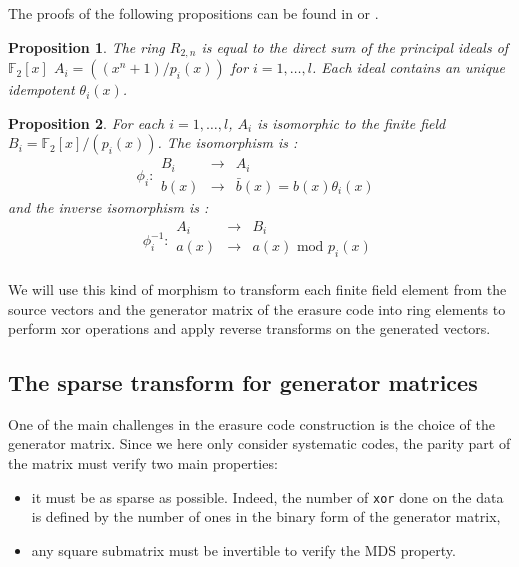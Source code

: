 \documentclass[conference]{IEEEtran}
\newtheorem{myprop}{Proposition}
\begin{document}
The proofs of the following propositions can be found in \cite{poli1992error} or \cite{MacWilliams19711}.

\begin{myprop}
	\label{prop:directSumDecomposition}
	The ring $R_{2,n}$ is equal to the direct sum of the principal ideals of  $\mathbb{F}_{2}[x]$ $A_i=( (x^n+1)/p_i(x) )$ for $i=1,\ldots,l$. 
	Each ideal contains an unique idempotent $\theta_i(x)$. 	
\end{myprop}

\begin{myprop}
	\label{prop:isomorphism}	
	For each $i=1,\ldots,l$, $A_i$ is isomorphic to the finite field $B_i=\mathbb{F}_{2}[x]/(p_i(x))$. The isomorphism is :
	\begin{equation}
	\phi_i  :  \begin{array}{ccc}
	B_i & \rightarrow & A_i \\
	b(x) & \rightarrow & \bar{b}(x)=b(x)\theta_i(x) \
	\end{array}
	\end{equation}  	
	and the inverse isomorphism is :
	\begin{equation}
	\phi_i^{-1}  :  \begin{array}{ccc}
	A_i & \rightarrow & B_i \\
	a(x) & \rightarrow & a(x)\textrm{ mod }p_i(x)\\
	\end{array}
	\end{equation}  	
\end{myprop}

We will use this kind of morphism to transform each finite field element from the source vectors and  the generator matrix of the erasure code into ring elements to perform xor operations and apply reverse transforms on the generated vectors.

\subsection{The sparse transform for generator matrices}
\label{sec:sparse}
One of the main challenges in the erasure code construction is the choice of the generator matrix. Since we here only consider systematic codes, the parity part of the matrix must verify two main properties:
\begin{itemize}
	\item it must be as sparse as possible. Indeed, the number of \texttt{xor} done on the data is defined by the number of ones in the binary form of the generator matrix,
	\item any square submatrix must be invertible to verify the MDS property.
\end{itemize} 
\end{document}
